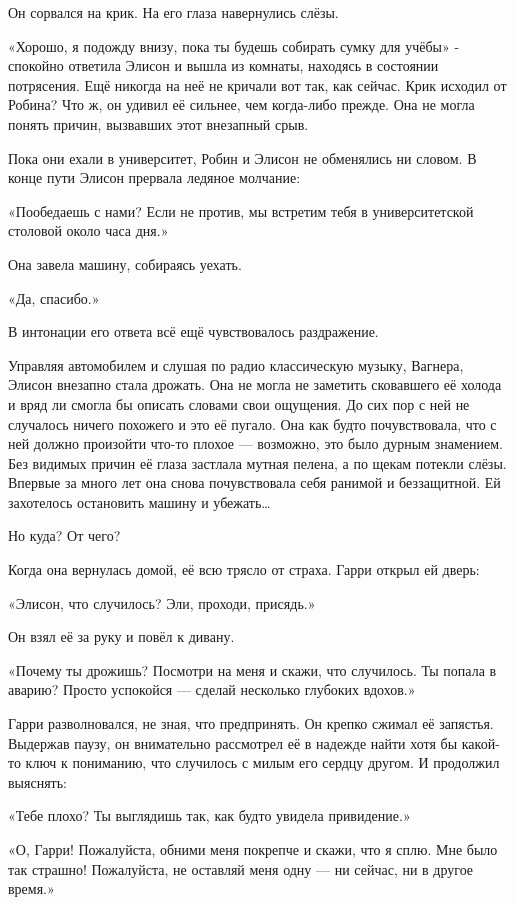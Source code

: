 \documentclass[a5paper, 9pt,
final, openany, twoside=true]{memoir}
\begin{document}
Он сорвался на крик. На его глаза навернулись слёзы.\bigskip

«Хорошо, я подожду внизу, пока ты будешь собирать сумку для учёбы» - спокойно ответила Элисон и вышла из комнаты, находясь в состоянии потрясения. Ещё никогда на неё не кричали вот так, как сейчас. Крик исходил от Робина? Что ж, он удивил её сильнее, чем когда-либо прежде. Она не могла понять причин, вызвавших этот внезапный срыв.\bigskip

Пока они ехали в университет, Робин и Элисон не обменялись ни словом. В конце пути Элисон прервала ледяное молчание:

«Пообедаешь с нами? Если не против, мы встретим тебя в университетской столовой около часа дня.»

Она завела машину, собираясь уехать.

«Да, спасибо.»

В интонации его ответа всё ещё чувствовалось раздражение.\bigskip

Управляя автомобилем и слушая по радио классическую музыку, Вагнера, Элисон внезапно стала дрожать. Она не могла не заметить сковавшего её холода и вряд ли смогла бы описать словами свои ощущения. До сих пор с ней не случалось ничего похожего и это её пугало. Она как будто почувствовала, что с ней должно произойти что-то плохое — возможно, это было дурным знамением. Без видимых причин её глаза застлала мутная пелена, а по щекам потекли слёзы. Впервые за много лет она снова почувствовала себя ранимой и беззащитной. Ей захотелось остановить машину и убежать…

Но куда? От чего?\bigskip

Когда она вернулась домой, её всю трясло от страха. Гарри открыл ей дверь:

«Элисон, что случилось? Эли, проходи, присядь.»

Он взял её за руку и повёл к дивану.

«Почему ты дрожишь? Посмотри на меня и скажи, что случилось. Ты попала в аварию? Просто успокойся — сделай несколько глубоких вдохов.»

Гарри разволновался, не зная, что предпринять. Он крепко сжимал её запястья. Выдержав паузу, он внимательно рассмотрел её в надежде найти хотя бы какой-то ключ к пониманию, что случилось с милым его сердцу другом. И продолжил выяснять:

«Тебе плохо? Ты выглядишь так, как будто увидела привидение.»

«О, Гарри! Пожалуйста, обними меня покрепче и скажи, что я сплю. Мне было так страшно! Пожалуйста, не оставляй меня одну — ни сейчас, ни в другое время.»
\end{document}
